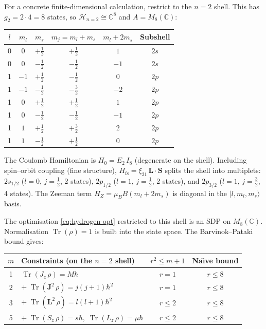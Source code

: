 \documentclass[11pt,a4paper]{article}
\theoremstyle{definition}
\newcommand{\Tr}{\operatorname{Tr}}
\newcommand{\ket}[1]{|#1\rangle}
\begin{document}
For a concrete finite-dimensional calculation, restrict to the
$n = 2$ shell.  This has $g_2 = 2 \cdot 4 = 8$ states, so
$\mathcal{H}_{n=2} \cong \mathbb{C}^8$ and $A = M_8(\mathbb{C})$:
\begin{center}
\begin{tabular}{cccccc}
\toprule
$l$ & $m_l$ & $m_s$ & $m_j = m_l + m_s$ & $m_l + 2m_s$ & \textbf{Subshell} \\
\midrule
0 & $0$   & $+\tfrac{1}{2}$ & $+\tfrac{1}{2}$ & $1$ & $2s$ \\
0 & $0$   & $-\tfrac{1}{2}$ & $-\tfrac{1}{2}$ & $-1$ & $2s$ \\
1 & $-1$  & $+\tfrac{1}{2}$ & $-\tfrac{1}{2}$ & $0$ & $2p$ \\
1 & $-1$  & $-\tfrac{1}{2}$ & $-\tfrac{3}{2}$ & $-2$ & $2p$ \\
1 & $0$   & $+\tfrac{1}{2}$ & $+\tfrac{1}{2}$ & $1$ & $2p$ \\
1 & $0$   & $-\tfrac{1}{2}$ & $-\tfrac{1}{2}$ & $-1$ & $2p$ \\
1 & $1$   & $+\tfrac{1}{2}$ & $+\tfrac{3}{2}$ & $2$ & $2p$ \\
1 & $1$   & $-\tfrac{1}{2}$ & $+\tfrac{1}{2}$ & $0$ & $2p$ \\
\bottomrule
\end{tabular}
\end{center}
The Coulomb Hamiltonian is $H_0 = E_2\, I_8$ (degenerate on the
shell).  Including spin--orbit coupling (fine structure),
$H_{\mathrm{fs}} = \xi_{21}\,\mathbf{L}\cdot\mathbf{S}$ splits the
shell into multiplets: $2s_{1/2}$ ($l = 0$, $j = \tfrac{1}{2}$, 2
states), $2p_{1/2}$ ($l = 1$, $j = \tfrac{1}{2}$, 2 states), and
$2p_{3/2}$ ($l = 1$, $j = \tfrac{3}{2}$, 4 states).  The Zeeman
term $H_Z = \mu_B B (m_l + 2m_s)$ is diagonal in the
$\ket{l, m_l, m_s}$ basis.

The optimisation \eqref{eq:hydrogen-opt} restricted to this shell is
an SDP on $M_8(\mathbb{C})$.  Normalisation $\Tr(\rho) = 1$ is built
into the state space.  The Barvinok--Pataki bound gives:
\begin{center}
\begin{tabular}{clcc}
\toprule
$m$ & \textbf{Constraints (on the $n=2$ shell)} & $r^2 \leq m + 1$
& \textbf{Na\"{\i}ve bound} \\
\midrule
1 & $\Tr(J_z\,\rho) = M\hbar$ & $r = 1$ & $r \leq 8$ \\
2 & $+\;\Tr(\mathbf{J}^2\,\rho) = j(j+1)\hbar^2$ & $r = 1$ & $r \leq 8$ \\
3 & $+\;\Tr(\mathbf{L}^2\,\rho) = l(l+1)\hbar^2$ & $r \leq 2$ & $r \leq 8$ \\
5 & $+\;\Tr(S_z\,\rho) = s\hbar,\; \Tr(L_z\,\rho) = \mu\hbar$ & $r \leq 2$
& $r \leq 8$ \\
\bottomrule
\end{tabular}
\end{center}
\end{document}
